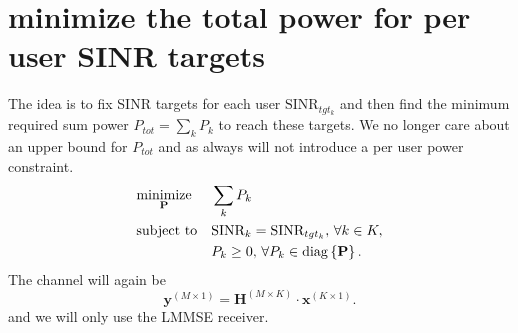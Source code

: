 \section{minimize the total power for per user SINR targets}
The idea is to fix SINR targets for each user $\text{SINR}_{tgt_k}$ and then find the minimum required sum power $P_{tot} = \sum_k{P_k}$ to reach these targets. We no longer care about an upper bound for $P_{tot}$ and as always will not introduce a per user power constraint.
\begin{equation}
	\begin{aligned}
		& \underset{\mathbf{P}}{\text{minimize}}
		& & \sum_k{P_k} \\
		& \text{subject to}
		& & \text{SINR}_k = \text{SINR}_{tgt_k},\,\forall k\in K, \\
		&&& P_k\geq 0,\,\forall P_k\in \mathrm{diag}\left\lbrace\mathbf{P}\right\rbrace.
	\end{aligned}
\end{equation}
The channel will again be
\begin{equation}
	\mathbf{y}^{(M\times 1)} = \mathbf{H}^{(M\times K)}\cdot \mathbf{x}^{(K\times 1)}.
\end{equation}
and we will only use the LMMSE receiver.


